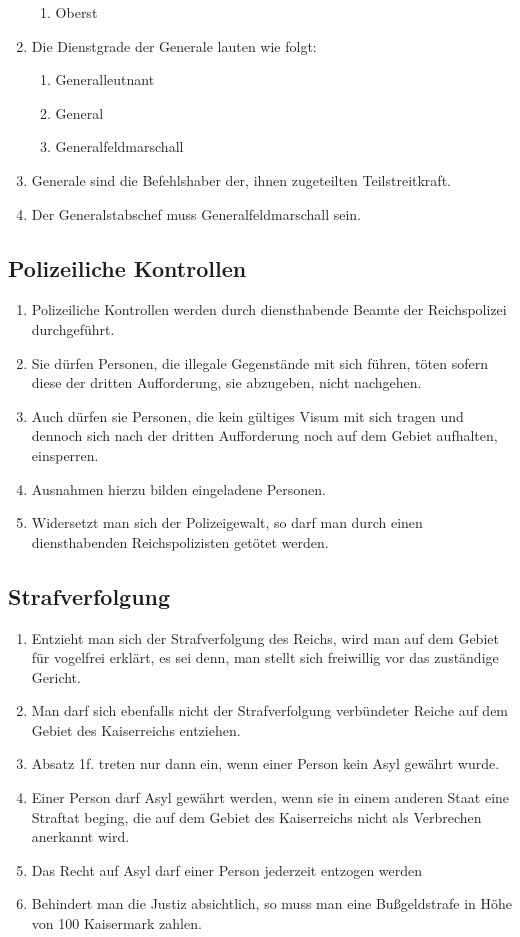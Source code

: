 \documentclass{article}
\begin{document}
\begin{enumerate}[(1)]
\begin{enumerate}[1.]
        \item Oberst
    \end{enumerate}
    \item Die Dienstgrade der Generale lauten wie folgt:
    \begin{enumerate}[1.]
        \item Generalleutnant
        \item General
        \item Generalfeldmarschall
    \end{enumerate}
    \item Generale sind die Befehlshaber der, ihnen zugeteilten Teilstreitkraft.
    \item Der Generalstabschef muss Generalfeldmarschall sein.
\end{enumerate}

\subsection{Polizeiliche Kontrollen}
\begin{enumerate}[(1)]
    \item Polizeiliche Kontrollen werden durch diensthabende Beamte der Reichspolizei durchgeführt.
    \item Sie dürfen Personen, die illegale Gegenstände mit sich führen, töten sofern diese der dritten Aufforderung, sie abzugeben, nicht nachgehen.
    \item Auch dürfen sie Personen, die kein gültiges Visum mit sich tragen und dennoch sich nach der dritten Aufforderung noch auf dem Gebiet aufhalten, einsperren.
    \item Ausnahmen hierzu bilden eingeladene Personen.
    \item Widersetzt man sich der Polizeigewalt, so darf man durch einen diensthabenden Reichspolizisten getötet werden.
\end{enumerate}

\subsection{Strafverfolgung}
\begin{enumerate}[(1)]
    \item Entzieht man sich der Strafverfolgung des Reichs, wird man auf dem Gebiet für vogelfrei erklärt, es sei denn, man stellt sich freiwillig vor das zuständige Gericht.
    \item Man darf sich ebenfalls nicht der Strafverfolgung verbündeter Reiche auf dem Gebiet des Kaiserreichs entziehen.
    \item Absatz 1f. treten nur dann ein, wenn einer Person kein Asyl gewährt wurde.
    \item Einer Person darf Asyl gewährt werden, wenn sie in einem anderen Staat eine Straftat beging, die auf dem Gebiet des Kaiserreichs nicht als Verbrechen anerkannt wird.
    \item Das Recht auf Asyl darf einer Person jederzeit entzogen werden
    \item Behindert man die Justiz absichtlich, so muss man eine Bußgeldstrafe in Höhe von 100 Kaisermark zahlen. 
\end{enumerate}
\end{document}
